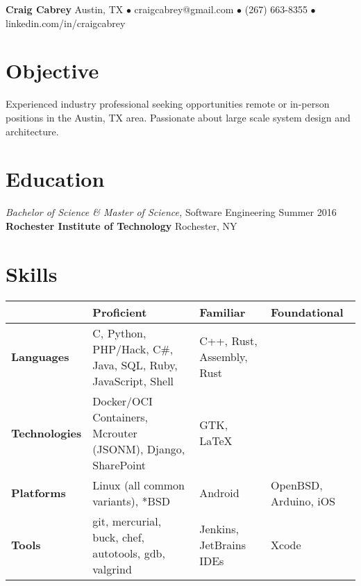 \documentclass[margin]{res}
\begin{document}
{\Huge\textbf{Craig Cabrey}}
\vspace{0.25cm}
\newline
Austin, TX $\bullet$
craigcabrey@gmail.com $\bullet$
(267) 663-8355 $\bullet$
linkedin.com/in/craigcabrey \vspace{-0.5cm}
\newline
\vspace{-0.25cm}

\begin{resume}

\section{Objective}  

Experienced industry professional seeking opportunities remote or in-person positions in the Austin, TX area. Passionate about large scale system design and architecture.

\section{Education}

{\sl Bachelor of Science \& Master of Science,} Software Engineering
\hfill Summer 2016 \\
\textbf{Rochester Institute of Technology} \hfill Rochester, NY
 
\section{Skills} 

{
\small
\renewcommand{\arraystretch}{1.5}
\begin{tabular}{
    >{\arraybackslash}p{2cm}
    >{\arraybackslash}p{5cm}
    >{\arraybackslash}p{4cm}
    >{\arraybackslash}p{3.75cm}}
    & \textbf{Proficient} & \textbf{Familiar} & \textbf{Foundational} \\ \hline
  \textbf{Languages} & C, Python, PHP/Hack, C\#, Java, SQL, Ruby,
                       JavaScript, Shell & C++, Rust, Assembly, Rust \\ \hline
  \textbf{Technologies} & Docker/OCI Containers, Mcrouter (JSONM),
                          Django, SharePoint & GTK, \LaTeX \\ \hline
  \textbf{Platforms} & Linux (all common variants), *BSD & Android &
                       OpenBSD, Arduino, iOS \\ \hline
  \textbf{Tools} & git, mercurial, buck, chef, autotools, gdb, valgrind &
                   Jenkins, JetBrains IDEs & Xcode
\end{tabular}
}


\end{resume}
\end{document}
